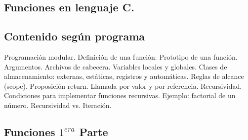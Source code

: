 \setcounter{subsection}{6}
\subsection*{Funciones en lenguaje C.}
\subsection*{Contenido según programa}
Programación modular. Definición de una función. Prototipo de una función. Argumentos. Archivos de cabecera. Variables locales y globales. Clases de almacenamiento: externas, estáticas, registros y automáticas. Reglas de alcance (scope). Proposición return. Llamada por valor y por referencia. Recursividad.  Condiciones para implementar funciones recursivas. Ejemplo: factorial de un número.  Recursividad vs. Iteración.

\setcounter{subsection}{6}
\subsection*{Funciones $1^{era}$ Parte}


